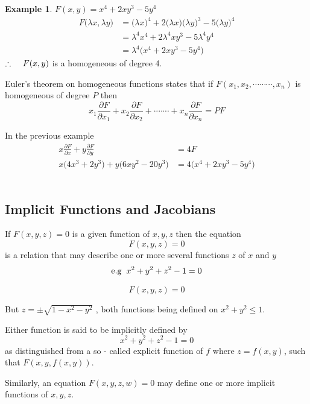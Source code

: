 \documentclass[11pt,a4paper]{article}
\theoremstyle{definition}
\newtheorem{exa}[thm]{Example}
\begin{document}
\begin{exa}


$F(x,y) = x^4 + 2xy^3 - 5y^4$
\begin{align*}
F\big(\lambda x, \lambda y\big) & = \big(\lambda x\big)^4 + 2\big(\lambda x\big)\big(\lambda y\big)^3 - 5\big(\lambda y\big)^4\\
& = \lambda^4 x^4 + 2\lambda^4xy^3 - 5\lambda^4 y^4\\
& = \lambda^4 \big(x^4 +2xy^3 - 5y^4\big)
\end{align*}
$\therefore\hspace{0.4cm}F(x,y)$ is a homogeneous of degree 4.


Euler's theorem on homogeneous functions states that if $F(x_1,x_2,\cdots\cdots\cdots, x_n)$ is homogeneous of degree $P$ then 
$$ x_1 \frac{\partial F}{\partial x_1} + x_2 \frac{\partial F}{\partial x_2} + \cdot\cdots\cdots +x_n \frac{\partial F}{\partial x_n} = P F$$

In the previous example
\begin{align*}
x \frac{\partial F}{\partial x} + y \frac{\partial F}{\partial y} & = 4 F\\
x\big(4x^3 + 2y^3\big) + y\big(6xy^2 -20y^3\big) &  = 4 \big( x^4 + 2xy^3 - 5y^4\big)\\\\\\\
\end{align*}
\end{exa}

{\color[wave]{485}\subsection{Implicit Functions and Jacobians}}
If $F(x,y,z) =0$ is a given function of $x,y,z$  then the equation $$F(x,y,z) =0$$ is a relation that may describe one or more several functions $z$ of $x$ and $y$
$$\text{e.g}\hspace{0.2cm} x^2 + y^2+ z^2 - 1 = 0$$

$$F(x,y,z) = 0$$

But $z = \pm \sqrt{1 -x^2 -y^2}$ , both functions being defined on $x^2  + y^2 \leq 1$.


Either function is said to be implicitly defined by $$x^2 + y^2 + z^2 - 1 =0$$ as distinguished from a so - called explicit function of $f$ where $z = f(x,y)$, such that $F(x,y,f(x,y))$.


Similarly, an equation $F(x,y,z,w)=0$ may define one or more implicit functions of $x,y,z$.
\end{document}

